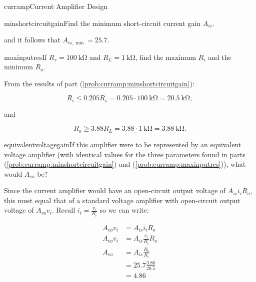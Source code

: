 \begin{mainquestion}{curramp}{Current Amplifier Design}
\begin{partquestion}{minshortcircuitgain}{Find the minimum short-circuit current gain $A_{is}$.}
\begin{answer}
and it follows that $A_{is,\min} = 25.7$.
\begin{kaitlyn}

\noindent{}

\end{kaitlyn}
\end{answer}
\end{partquestion}

\begin{partquestion}{maxinputres}{If $R_{s} = \qty{100}{\kilo\ohm}$ and $R_{L} = \qty{1}{\kilo\ohm}$, find the maximum $R_{i}$ and the minimum $R_{o}$.}
\begin{answer}
From the results of part (\cref{prob:curramp:minshortcircuitgain}):

\[
R_{i} \leq 0.205 R_{s} = 0.205 \cdot \qty{100}{\kilo\ohm} = \qty{20.5}{\kilo\ohm},
\]

and

\[
R_{o} \geq 3.88 R_{L} = 3.88 \cdot \qty{1}{\kilo\ohm} = \qty{3.88}{\kilo\ohm}.
\]
\end{answer}
\end{partquestion}

\begin{partquestion}{equivalentvoltagegain}{If this amplifier were to be represented by an equivalent voltage amplifier (with identical values for the three parameters found in parts (\cref{prob:curramp:minshortcircuitgain}) and (\cref{prob:curramp:maxinputres})), what would $A_{vo}$ be?}
\begin{answer}
Since the current amplifier would have an open-circuit output voltage of $A_{is} i_{i} R_{o}$, this must equal that of a standard voltage amplifier with open-circuit output voltage of $A_{vo} v_{i}$. Recall $i_{i} = \frac{v_{i}}{R_{i}}$ so we can write:

\begin{align*}
    A_{vo} v_i &= A_{is} i_{i} R_o \\
    A_{vo} v_i &= A_{is} \frac{v_i}{R_i} R_o \\
    A_{vo} &= A_{is} \frac{R_o}{R_i} \\
    &= 25.7 \frac{3.88}{20.5} \\
    &= 4.86
\end{align*}
\begin{kaitlyn}


\end{kaitlyn}
\end{answer}
\end{partquestion}
\end{mainquestion}
